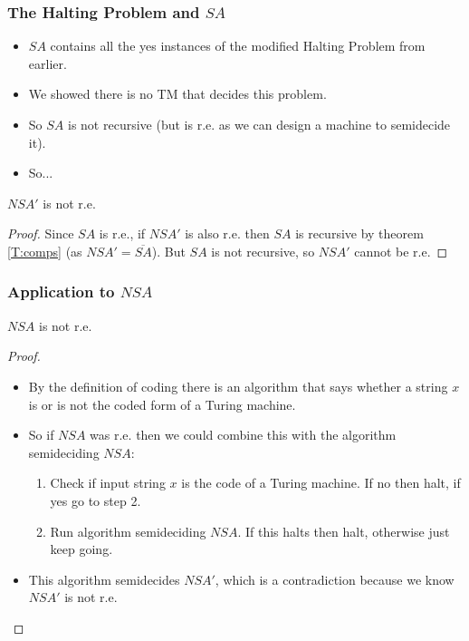 \documentclass[handout]{beamer}
\begin{document}
\begin{frame}
\frametitle{The Halting Problem and $SA$}
\begin{itemize}
\item $SA$ contains all the yes instances of the modified Halting Problem from earlier.
\item We showed there is no TM that decides this problem.
\item So $SA$ is not recursive (but is r.e. as we can design a machine to semidecide it).
\item So...
\end{itemize}

\begin{theorem}
$NSA'$ is not r.e.
\end{theorem}
\begin{proof}
Since $SA$ is r.e., if $NSA'$ is also r.e. then $SA$ is recursive by theorem \ref{T:comps} (as $NSA'=\overline{SA}$). But $SA$ is not recursive, so $NSA'$ cannot be r.e.
\end{proof}
\end{frame}

\begin{frame}
\frametitle{Application to $NSA$}
\begin{corollary}
$NSA$ is not r.e.
\end{corollary}
\begin{proof}
\begin{itemize}
\item By the definition of coding there is an algorithm that says whether a string $x$ is or is not the coded form of a Turing machine. 
\item So if $NSA$ was r.e. then we could combine this with the algorithm semideciding $NSA$:
\begin{enumerate}
\item Check if input string $x$ is the code of a Turing machine. If no then halt, if yes go to step 2.
\item Run algorithm semideciding $NSA$. If this halts then halt, otherwise just keep going. 
\end{enumerate} 
\item This algorithm semidecides $NSA'$, which is a contradiction because we know $NSA'$ is not r.e.
\end{itemize}
\end{proof}
\end{frame}
\end{document}
